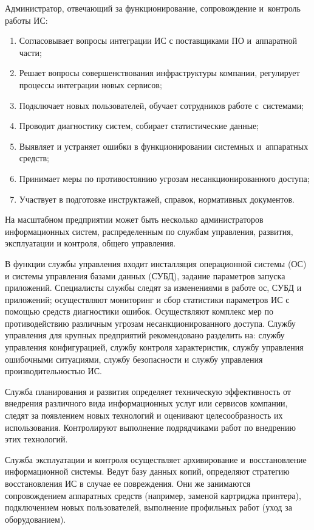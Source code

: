 \documentclass{ou}
\begin{document}
Администратор, отвечающий за функционирование, сопровождение и~контроль работы ИС:
\begin{enumerate}[leftmargin=0em, itemindent=3.75em, nosep, label=\arabic*)]
\item Согласовывает вопросы интеграции ИС с поставщиками ПО и~аппаратной части;
\item Решает вопросы совершенствования инфраструктуры компании, регулирует процессы интеграции новых сервисов;
\item Подключает новых пользователей, обучает сотрудников работе с~системами;
\item Проводит диагностику систем, собирает статистические данные;
\item Выявляет и устраняет ошибки в функционировании системных и~аппаратных средств;
\item Принимает меры по противостоянию угрозам несанкционированного доступа;
\item Участвует в подготовке инструктажей, справок, нормативных документов.
\end{enumerate}

На масштабном предприятии может быть несколько администраторов информационных систем, распределенным по службам управления, развития, эксплуатации и контроля, общего управления.

В функции службы управления входит инсталляция операционной системы (ОС) и системы управления базами данных (СУБД), задание параметров запуска приложений. Специалисты службы следят за изменениями в работе ос, СУБД и приложений; осуществляют мониторинг и сбор статистики параметров ИС с помощью средств диагностики ошибок. Осуществляют комплекс мер по противодействию различным угрозам несанкционированного доступа. Службу управления для крупных предприятий рекомендовано разделить на: службу управления конфигурацией, службу контроля характеристик, службу управления ошибочными ситуациями, службу безопасности и службу управления производительностью ИС.

Служба планирования и развития определяет техническую эффективность от внедрения различного вида информационных услуг или сервисов компании, следят за появлением новых технологий и оценивают целесообразность их использования. Контролируют выполнение подрядчиками работ по внедрению этих технологий.

Служба эксплуатации и контроля осуществляет архивирование и~восстановление информационной системы. Ведут базу данных копий, определяют стратегию восстановления ИС в случае ее повреждения. Они же занимаются сопровождением аппаратных средств (например, заменой картриджа принтера), подключением новых пользователей, выполнение профильных работ (уход за оборудованием).
\end{document}
